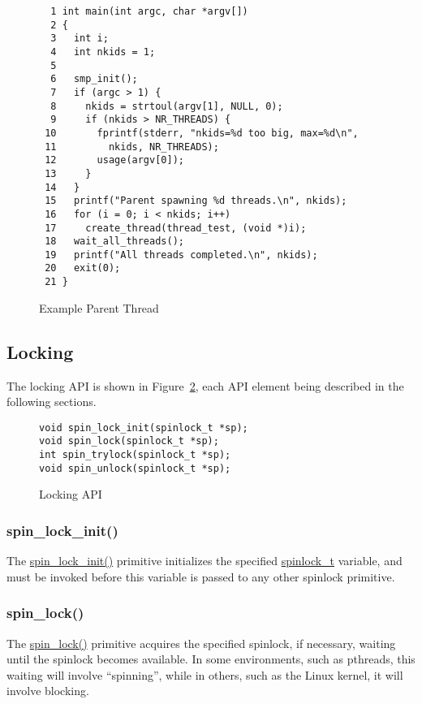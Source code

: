 \begin{figure}[htbp] 
{ \scriptsize
\begin{verbatim}
  1 int main(int argc, char *argv[])
  2 {
  3   int i;
  4   int nkids = 1;
  5 
  6   smp_init();
  7   if (argc > 1) {
  8     nkids = strtoul(argv[1], NULL, 0);
  9     if (nkids > NR_THREADS) {
 10       fprintf(stderr, "nkids=%d too big, max=%d\n",
 11         nkids, NR_THREADS);
 12       usage(argv[0]);
 13     }
 14   }
 15   printf("Parent spawning %d threads.\n", nkids);
 16   for (i = 0; i < nkids; i++)
 17     create_thread(thread_test, (void *)i);
 18   wait_all_threads();
 19   printf("All threads completed.\n", nkids);
 20   exit(0);
 21 }
\end{verbatim}
}
\caption{Example Parent Thread}
\label{fig:intro:Example Parent Thread}
\end{figure}

\subsection{Locking}
\label{sec:intro:Locking}

The locking API is shown in
Figure~\ref{fig:intro:Locking API},
each API element being described in the following sections.

\begin{figure}[htbp] 
{ \scriptsize
\begin{verbatim}
void spin_lock_init(spinlock_t *sp);
void spin_lock(spinlock_t *sp);
int spin_trylock(spinlock_t *sp);
void spin_unlock(spinlock_t *sp);
\end{verbatim}
}
\caption{Locking API}
\label{fig:intro:Locking API}
\end{figure}

\subsubsection{spin\_lock\_init()}

The \url{spin_lock_init()} primitive initializes the specified
\url{spinlock_t} variable, and must be invoked before
this variable is passed to any other spinlock primitive.

\subsubsection{spin\_lock()}

The \url{spin_lock()} primitive acquires the specified spinlock,
if necessary, waiting until the spinlock becomes available.
In some environments, such as pthreads, this waiting will involve
``spinning'', while
in others, such as the Linux kernel, it will involve blocking.

